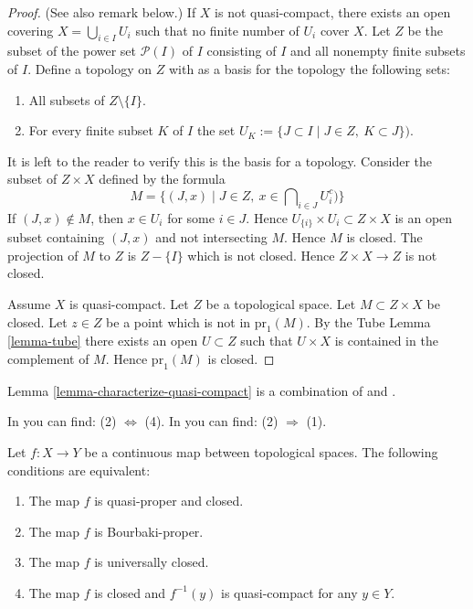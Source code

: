 \begin{proof}
(See also remark below.)
If $X$ is not quasi-compact, there exists an open covering
$X = \bigcup_{i \in I} U_i$ such that no finite
number of $U_i$ cover $X$.
Let $Z$ be the subset of the power set $\mathcal{P}(I)$ of $I$
consisting of $I$ and all nonempty finite subsets of $I$.
Define a topology on $Z$ with as a basis for the topology
the following sets:
\begin{enumerate}
\item All subsets of $Z\setminus\{I\}$.
\item For every finite subset $K$ of $I$ the set
$U_K := \{J\subset I \mid J \in Z, \ K\subset J \})$.
\end{enumerate}
It is left to the reader to verify this is the basis for a topology.
Consider the subset of $Z \times X$ defined by the formula
$$
M = \{(J, x) \mid J \in Z, \ x \in \bigcap\nolimits_{i \in J} U_i^c)\}
$$
If $(J, x) \not \in M$, then $x \in U_i$ for some $i \in J$.
Hence $U_{\{i\}} \times U_i \subset Z \times X$ is an open
subset containing $(J, x)$ and not intersecting $M$. Hence
$M$ is closed. The projection of $M$ to $Z$ is $Z-\{I\}$
which is not closed. Hence $Z \times X \to Z$ is not closed.

\medskip\noindent
Assume $X$ is quasi-compact. Let $Z$ be a topological space.
Let $M \subset  Z \times X$ be closed. Let $z \in Z$ be a point
which is not in $\text{pr}_1(M)$. By the Tube Lemma \ref{lemma-tube}
there exists an open $U \subset Z$ such that $U \times X$ is
contained in the complement of $M$. Hence $\text{pr}_1(M)$ is closed.
\end{proof}

\begin{remark}
\label{remark-lemma-literature}
Lemma \ref{lemma-characterize-quasi-compact} is a combination of
\cite[I, p. 75, Lemme 1]{Bourbaki} and
\cite[I, p. 76, Corollaire 1]{Bourbaki}.
\end{remark}

\begin{theorem}
\label{theorem-characterize-proper}
\begin{reference}
In \cite[I, p. 75, Theorem 1]{Bourbaki} you can find:
(2) $\Leftrightarrow$ (4).
In \cite[I, p. 77, Proposition 6]{Bourbaki} you can find:
(2) $\Rightarrow$ (1).
\end{reference}
Let $f: X\to Y$ be a continuous map between
topological spaces. The following conditions are equivalent:
\begin{enumerate}
\item The map $f$ is quasi-proper and closed.
\item The map $f$ is Bourbaki-proper.
\item The map $f$ is universally closed.
\item The map $f$ is closed and $f^{-1}(y)$ is quasi-compact for any
$y\in Y$.
\end{enumerate}
\end{theorem}


